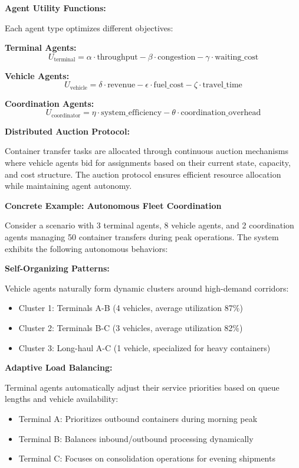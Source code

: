 \documentclass{article}
\begin{document}
\textbf{Agent Utility Functions:}

Each agent type optimizes different objectives:

\textbf{Terminal Agents:}
\[
U_{\text{terminal}} = \alpha \cdot \text{throughput} - \beta \cdot \text{congestion} - \gamma \cdot \text{waiting\_cost}
\]

\textbf{Vehicle Agents:}
\[
U_{\text{vehicle}} = \delta \cdot \text{revenue} - \epsilon \cdot \text{fuel\_cost} - \zeta \cdot \text{travel\_time}
\]

\textbf{Coordination Agents:}
\[
U_{\text{coordinator}} = \eta \cdot \text{system\_efficiency} - \theta \cdot \text{coordination\_overhead}
\]

\textbf{Distributed Auction Protocol:}

Container transfer tasks are allocated through continuous auction mechanisms where vehicle agents bid for assignments based on their current state, capacity, and cost structure. The auction protocol ensures efficient resource allocation while maintaining agent autonomy.

\textbf{Concrete Example: Autonomous Fleet Coordination}

Consider a scenario with 3 terminal agents, 8 vehicle agents, and 2 coordination agents managing 50 container transfers during peak operations. The system exhibits the following autonomous behaviors:

\textbf{Self-Organizing Patterns:}

Vehicle agents naturally form dynamic clusters around high-demand corridors:
\begin{itemize}
\item Cluster 1: Terminals A-B (4 vehicles, average utilization 87\%)
\item Cluster 2: Terminals B-C (3 vehicles, average utilization 82\%)
\item Cluster 3: Long-haul A-C (1 vehicle, specialized for heavy containers)
\end{itemize}

\textbf{Adaptive Load Balancing:}

Terminal agents automatically adjust their service priorities based on queue lengths and vehicle availability:
\begin{itemize}
\item Terminal A: Prioritizes outbound containers during morning peak
\item Terminal B: Balances inbound/outbound processing dynamically
\item Terminal C: Focuses on consolidation operations for evening shipments
\end{itemize}
\end{document}
